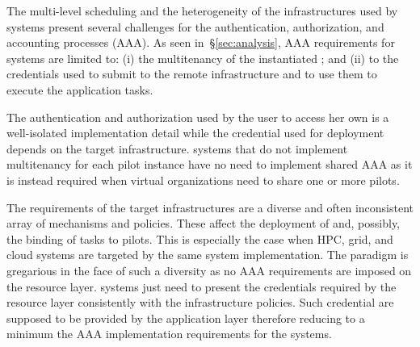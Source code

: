 \documentclass{sig-alternate}
\begin{document}

The multi-level scheduling and the heterogeneity of the infrastructures used by
\pilot systems present several challenges for the authentication,
authorization, and accounting processes (AAA). As seen in~\S\ref{sec:analysis},
AAA requirements for \pilot systems are limited to: (i) the multitenancy of the
instantiated \pilots; and (ii) to the credentials used to submit \pilots to
the remote infrastructure and to use them to execute the application tasks.

The authentication and authorization used by the user to access her own \pilots
is a well-isolated implementation detail while the credential used for \pilot
deployment depends on the target infrastructure. \pilot systems that do not
implement multitenancy for each pilot instance have no need to implement shared
AAA as it is instead required when virtual organizations need to share one or
more pilots.

The requirements of the target infrastructures are a diverse and often
inconsistent array of mechanisms and policies. These affect the deployment of
\pilots and, possibly, the binding of tasks to pilots. This is especially the
case when HPC, grid, and cloud systems are targeted by the same \pilot system
implementation. The \pilot paradigm is gregarious in the face of such a
diversity as no AAA requirements are imposed on the resource layer. \pilot
systems just need to present the credentials required by the resource layer
consistently with the infrastructure policies. Such credential are supposed to
be provided by the application layer therefore reducing to a minimum the AAA
implementation requirements for the \pilot systems.


\end{document}

